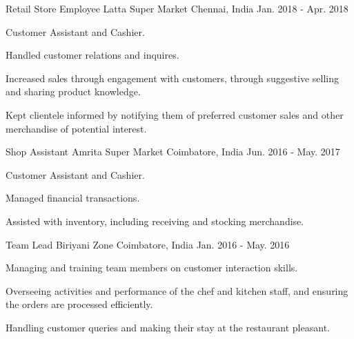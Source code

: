 \begin{cventries}
\cventry
    {Retail Store Employee}
    {Latta Super Market}
    {Chennai, India}
    {Jan. 2018 - Apr. 2018}
    {
      \begin{cvitems}
        \item {Customer Assistant and Cashier.}
        \item {Handled customer relations and inquires.}
        \item {Increased sales through engagement with customers, through suggestive selling and sharing product knowledge.}
        \item {Kept clientele informed by notifying them of preferred customer sales and other merchandise of potential interest.}
      \end{cvitems}
    }
\cventry
    {Shop Assistant}
    {Amrita Super Market}
    {Coimbatore, India}
    {Jun. 2016 - May. 2017}
    {
      \begin{cvitems}
        \item {Customer Assistant and Cashier.}
        \item {Managed financial transactions.}
        \item {Assisted with inventory, including receiving and stocking merchandise.}
      \end{cvitems}
    }
\cventry
    {Team Lead}
    {Biriyani Zone}
    {Coimbatore, India}
    {Jan. 2016 - May. 2016}
    {
      \begin{cvitems}
        \item {Managing and training team members on customer interaction skills.}
        \item{Overseeing activities and performance of the chef and kitchen staff, and ensuring the orders are processed efficiently.}
        \item{Handling customer queries and making their stay at the restaurant pleasant.}
      \end{cvitems}
    }
\end{cventries}
